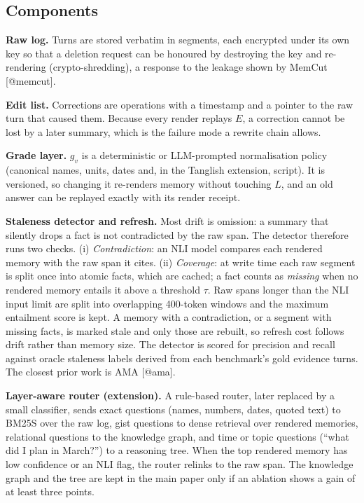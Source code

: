\subsection{Components}
\textbf{Raw log.} Turns are stored verbatim in segments, each encrypted under its own key so that a deletion request can be honoured by destroying the key and re-rendering (crypto-shredding), a response to the leakage shown by MemCut [@memcut].

\textbf{Edit list.} Corrections are operations with a timestamp and a pointer to the raw turn that caused them. Because every render replays $E$, a correction cannot be lost by a later summary, which is the failure mode a rewrite chain allows.

\textbf{Grade layer.} $g_v$ is a deterministic or LLM-prompted normalisation policy (canonical names, units, dates and, in the Tanglish extension, script). It is versioned, so changing it re-renders memory without touching $L$, and an old answer can be replayed exactly with its render receipt.

\textbf{Staleness detector and refresh.} Most drift is omission: a summary that silently drops a fact is not contradicted by the raw span. The detector therefore runs two checks. (i) \textit{Contradiction}: an NLI model compares each rendered memory with the raw span it cites. (ii) \textit{Coverage}: at write time each raw segment is split once into atomic facts, which are cached; a fact counts as \textit{missing} when no rendered memory entails it above a threshold $\tau$. Raw spans longer than the NLI input limit are split into overlapping 400-token windows and the maximum entailment score is kept. A memory with a contradiction, or a segment with missing facts, is marked stale and only those are rebuilt, so refresh cost follows drift rather than memory size. The detector is scored for precision and recall against oracle staleness labels derived from each benchmark's gold evidence turns. The closest prior work is AMA [@ama].

\textbf{Layer-aware router (extension).} A rule-based router, later replaced by a small classifier, sends exact questions (names, numbers, dates, quoted text) to BM25S over the raw log, gist questions to dense retrieval over rendered memories, relational questions to the knowledge graph, and time or topic questions (``what did I plan in March?'') to a reasoning tree. When the top rendered memory has low confidence or an NLI flag, the router relinks to the raw span. The knowledge graph and the tree are kept in the main paper only if an ablation shows a gain of at least three points.

